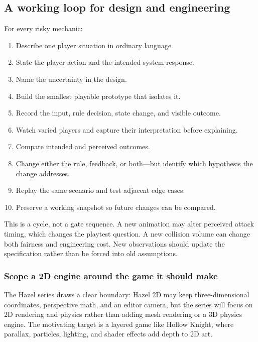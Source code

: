 \subsection{A working loop for design and engineering}\label{06-engine-ii-ch041-a-working-loop-for-design-and-engineering}

\hypertarget{06-engine-ii-ch041-a-working-loop-for-design-and-engineering}{}

For every risky mechanic:

\begin{enumerate}
\def\labelenumi{\arabic{enumi}.}
\tightlist
\item
  Describe one player situation in ordinary language.
\item
  State the player action and the intended system response.
\item
  Name the uncertainty in the design.
\item
  Build the smallest playable prototype that isolates it.
\item
  Record the input, rule decision, state change, and visible outcome.
\item
  Watch varied players and capture their interpretation before explaining.
\item
  Compare intended and perceived outcomes.
\item
  Change either the rule, feedback, or both---but identify which hypothesis the change addresses.
\item
  Replay the same scenario and test adjacent edge cases.
\item
  Preserve a working snapshot so future changes can be compared.
\end{enumerate}

This is a cycle, not a gate sequence. A new animation may alter perceived attack timing, which changes the playtest question. A new collision volume can change both fairness and engineering cost. New observations should update the specification rather than be forced into old assumptions.

\subsubsection{Scope a 2D engine around the game it should make}\label{06-engine-ii-ch041-scope-a-2d-engine-around-the-game-it-should-make}

\hypertarget{06-engine-ii-ch041-scope-a-2d-engine-around-the-game-it-should-make}{}

The Hazel series draws a clear boundary: Hazel 2D may keep three-dimensional coordinates, perspective math, and an editor camera, but the series will focus on 2D rendering and physics rather than adding mesh rendering or a 3D physics engine. The motivating target is a layered game like Hollow Knight, where parallax, particles, lighting, and shader effects add depth to 2D art.

